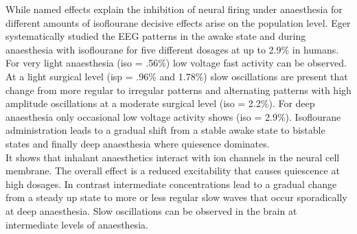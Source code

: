 While named effects explain the inhibition of neural firing under anaesthesia for different amounts of isoflourane decisive effects arise on the population level. Eger \parencite*{eger1981isoflurane} systematically studied the EEG patterns in the awake state and during anaesthesia with isoflourane for five different dosages at up to 2.9\% in humans. For very light anaesthesia (iso = .56\%) low voltage fast activity can be observed. At a light surgical level (isp = .96\% and 1.78\%) slow oscillations are present that change from more regular to irregular patterns and alternating patterns with high amplitude oscillations at a moderate surgical level (iso = 2.2\%). For deep anaesthesia only occasional low voltage activity shows (iso = 2.9\%). Isoflourane administration leads to a gradual shift from a stable awake state to bistable states and finally deep anaesthesia where quiesence dominates.\\
It shows that inhalant anaesthetics interact with ion channels in the neural cell membrane. The overall effect is a reduced excitability that causes quiescence at high dosages. In contrast intermediate concentrations lead to a gradual change from a steady up state to more or less regular slow waves that occur sporadically at deep anaesthesia. Slow oscillations can be observed in the brain at intermediate levels of anaesthesia.

